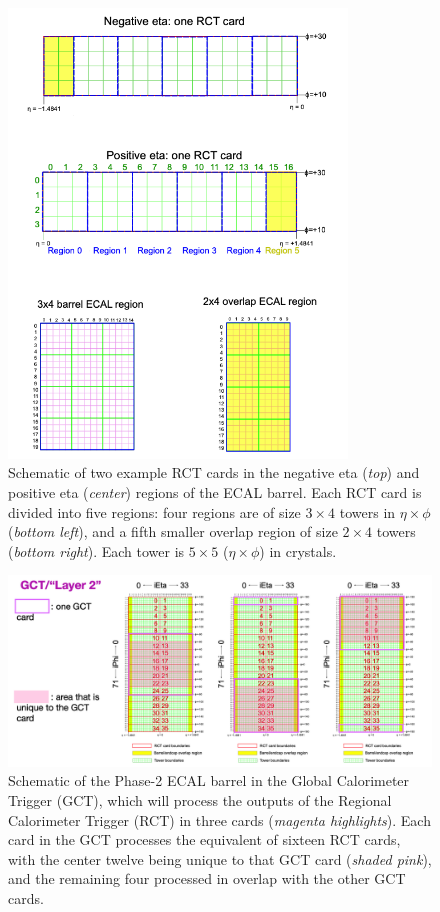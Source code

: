 \begin{figure}[ht]
    \centering
    \includegraphics[width=9cm]{figures/ch-3-phase2/phase-2-one-rct-card-schematic.png}
    \caption{Schematic of two example RCT cards in the negative eta (\textit{top}) and positive eta (\textit{center}) regions of the ECAL barrel. Each RCT card is divided into five regions: four regions are of size $3 \times 4$ towers in $\eta \times \phi$ (\textit{bottom left}), and a fifth smaller overlap region of size $2 \times 4$ towers (\textit{bottom right}). Each tower is $5 \times 5$ ($\eta\times\phi$) in crystals.}
    \label{fig:phase-2-one-rct-card-schematic}
\end{figure}


\begin{figure}[ht]
    \centering
    \includegraphics[width=15cm]{figures/ch-3-phase2/phase-2-gct-cards-schematic.png}
    \caption{Schematic of the Phase-2 ECAL barrel in the Global Calorimeter Trigger (GCT), which will process the outputs of the Regional Calorimeter Trigger (RCT) in three cards (\textit{magenta highlights}). Each card in the GCT processes the equivalent of sixteen RCT cards, with the center twelve being unique to that GCT card (\textit{shaded pink}), and the remaining four processed in overlap with the other GCT cards.}
    \label{fig:phase-2-gct-cards-schematic}
\end{figure}


